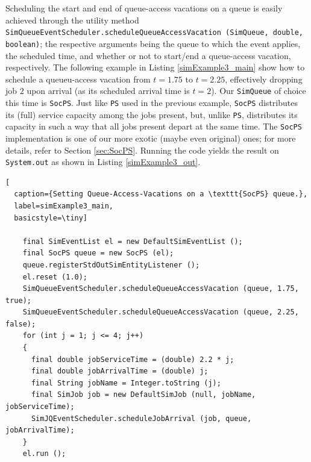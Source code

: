 \documentclass[12pt]{book}
\begin{document}
Scheduling the start and end of queue-access vacations on a queue
  is easily achieved through the utility method
  \lstinline|SimQueueEventScheduler.scheduleQueueAccessVacation (SimQueue, double, boolean)|;
  the respective arguments being the queue to which the event applies,
  the scheduled time,
  and whether or not to start/end a queue-access vacation,
  respectively.
The following example in Listing \ref{simExample3_main}
  show how to schedule a queueu-access vacation from
  $t=1.75$ to $t=2.25$, effectively dropping job $2$
  upon arrival (as its scheduled arrival time is $t=2$).
Our \lstinline|SimQueue| of choice this time is \lstinline|SocPS|.
Just like \lstinline|PS| used in the previous example,
  \lstinline|SocPS| distributes its (full) service capacity
  among the jobs present,
  but, unlike \lstinline|PS|,
  distributes its capacity in such a way that all
  jobs present depart at the same time.
The \lstinline|SocPS| implementation
  is one of our more exotic (maybe even original) ones;
  for more details,
  refer to Section \ref{sec:SocPS}.
Running the code yields the result on \lstinline|System.out|
  as shown in Listing \ref{simExample3_out}.

\begin{lstfloat}
\begin{lstlisting}[
  caption={Setting Queue-Access-Vacations on a \texttt{SocPS} queue.},
  label=simExample3_main,
  basicstyle=\tiny]

    final SimEventList el = new DefaultSimEventList ();
    final SocPS queue = new SocPS (el);
    queue.registerStdOutSimEntityListener ();
    el.reset (1.0);
    SimQueueEventScheduler.scheduleQueueAccessVacation (queue, 1.75, true);
    SimQueueEventScheduler.scheduleQueueAccessVacation (queue, 2.25, false);
    for (int j = 1; j <= 4; j++)
    {
      final double jobServiceTime = (double) 2.2 * j;
      final double jobArrivalTime = (double) j;
      final String jobName = Integer.toString (j);
      final SimJob job = new DefaultSimJob (null, jobName, jobServiceTime);
      SimJQEventScheduler.scheduleJobArrival (job, queue, jobArrivalTime);
    }
    el.run ();

\end{lstlisting}
\end{lstfloat}
  
\end{document}
